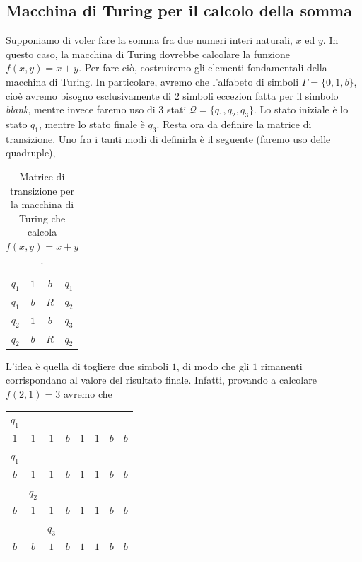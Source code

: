 \documentclass[10pt]{book}
\begin{document}
\subsection{Macchina di Turing per il calcolo della somma}

Supponiamo di voler fare la somma fra due numeri interi naturali, $x$ ed $y$.
In questo caso, la macchina di Turing dovrebbe calcolare la funzione $f(x,y) =
x + y$. Per fare ciò, costruiremo gli elementi fondamentali della macchina di
Turing. In particolare, avremo che l'alfabeto di simboli $\Gamma = \{0, 1,
b\}$, cioè avremo bisogno esclusivamente di $2$ simboli eccezion fatta per il
simbolo \emph{blank}, mentre invece faremo uso di $3$ stati $\mathcal Q =
\{q_1, q_2, q_3\}$. Lo stato iniziale è lo stato $q_1$, mentre lo stato finale
è $q_3$. Resta ora da definire la matrice di transizione. Uno fra i tanti modi
di definirla è il seguente (faremo uso delle quadruple),


\begin{table}[ht]
\centering
\begin{tabular}{cccc}
    $q_1$ & $1$ & $b$ & $q_1$\\
    $q_1$ & $b$ & $R$ & $q_2$\\
    $q_2$ & $1$ & $b$ & $q_3$\\
    $q_2$ & $b$ & $R$ & $q_2$

\end{tabular}
\caption{Matrice di transizione per la macchina di Turing che calcola $f(x,y) =
x + y$.}\label{tab:mdtSomma}
\end{table}
\bigskip

L'idea è quella di togliere due simboli $1$, di modo che gli $1$ rimanenti
corrispondano al valore del risultato finale. Infatti, provando a calcolare
$f(2, 1) = 3$ avremo che

\begin{table}[ht]
\centering
\begin{tabular}{cccccccc}
   $q_1$&     &     &     &     &     &     &     \\
    $1$ & $1$ & $1$ & $b$ & $1$ & $1$ & $b$ & $b$ \\
   $q_1$&     &     &     &     &     &     &     \\
    $b$ & $1$ & $1$ & $b$ & $1$ & $1$ & $b$ & $b$ \\
        &$q_2$&     &     &     &     &     &     \\
    $b$ & $1$ & $1$ & $b$ & $1$ & $1$ & $b$ & $b$ \\
        &     &$q_3$&     &     &     &     &     \\
    $b$ & $b$ & $1$ & $b$ & $1$ & $1$ & $b$ & $b$
\end{tabular}
\end{table}
\bigskip
\end{document}
